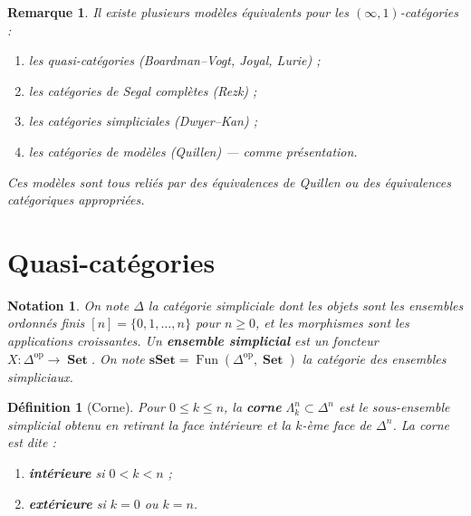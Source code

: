 \documentclass[a4paper,12pt]{book}
\DeclareMathOperator{\Fun}{Fun}
\DeclareMathOperator{\Set}{\mathbf{Set}}
\newcommand{\op}{\mathrm{op}}
\newtheorem{definition}[theoreme]{Définition}
\newtheorem*{remarque}{Remarque}
\newtheorem*{notation}{Notation}
\begin{document}
\begin{remarque}\label{rem:modeles-infty}
Il existe plusieurs modèles équivalents pour les $(\infty,1)$-catégories :
\begin{enumerate}[label=(\alph*)]
\item les quasi-catégories (Boardman--Vogt, Joyal, Lurie) ;
\item les catégories de Segal complètes (Rezk) ;
\item les catégories simpliciales (Dwyer--Kan) ;
\item les catégories de modèles (Quillen) --- comme présentation.
\end{enumerate}
Ces modèles sont tous reliés par des équivalences de Quillen ou
des équivalences catégoriques appropriées.
\end{remarque}

\section{Quasi-catégories}\label{sec:quasi-categories}


\begin{notation}\label{not:simplicial}
On note $\Delta$ la catégorie simpliciale dont les objets sont les
ensembles ordonnés finis $[n] = \{0, 1, \ldots, n\}$ pour $n \geq 0$,
et les morphismes sont les applications croissantes.
Un \textbf{ensemble simplicial} est un foncteur
$X \colon \Delta^\op \to \Set$.
On note $\mathbf{sSet} = \Fun(\Delta^\op, \Set)$ la catégorie
des ensembles simpliciaux.
\end{notation}

\begin{definition}[Corne]\label{def:corne}
Pour $0 \leq k \leq n$, la \textbf{corne}
$\Lambda^n_k \subset \Delta^n$ est le sous-ensemble simplicial
obtenu en retirant la face intérieure et la $k$-ème face de
$\Delta^n$.  La corne est dite :
\begin{enumerate}[label=(\roman*)]
\item \textbf{intérieure} si $0 < k < n$ ;
\item \textbf{extérieure} si $k = 0$ ou $k = n$.
\end{enumerate}
\end{definition}
\end{document}
